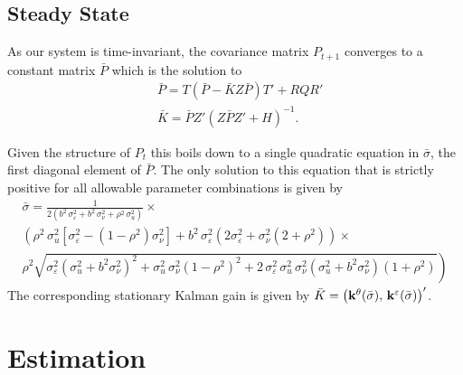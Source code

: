 \documentclass[a4,12pt]{article}
\begin{document}
\subsection*{Steady State}

As our system is time-invariant, the covariance matrix $P_{t+1}$ converges to a constant matrix $\bar{P}$ which is the solution to
\begin{align*}
&\bar{P} = T (\bar{P} - \bar{K} Z \bar{P}) T' + R Q R'\\
& \bar{K} = \bar{P} Z' (Z \bar{P} Z' + H)^{-1}.
\end{align*}

Given the structure of $P_t$ this boils down to a single quadratic equation in $\bar{\sigma}$, the first diagonal element of $\bar{P}$. The only solution to this equation that is strictly positive for all allowable parameter combinations is given by
\begin{multline*}
\bar{\sigma} = \frac{1}{2(b^2 \, \sigma_\varepsilon^2 + b^2 \, \sigma_\nu^2 + \rho^2 \, \sigma_u^2)} \times \\
\left( \rho^2 \, \sigma_u^2 \left[ \sigma_\varepsilon^2 - (1-\rho^2) \sigma_\nu^2 \right] + b^2 \, \sigma_\varepsilon^2 (2 \sigma_\varepsilon^2 + \sigma_\nu^2 (2 + \rho^2)) \right. \times \\
\left. \rho^2 \sqrt{\sigma_\varepsilon^2 (\sigma_u^2 + b^2 \sigma_\nu^2)^2 + \sigma_u^2 \, \sigma_\nu^2 (1-\rho^2)^2 + 2 \, \sigma_\varepsilon^2 \, \sigma_u^2 \, \sigma_\nu^2 (\sigma_u^2 + b^2 \sigma_\nu^2)(1+\rho^2)} \right)
\end{multline*}
The corresponding stationary Kalman gain is given by $\bar{K} = \left(\bold{k}^\theta(\bar{\sigma}), \, \bold{k}^\varepsilon(\bar{\sigma})\right)'$.

\section{Estimation}
\end{document}
